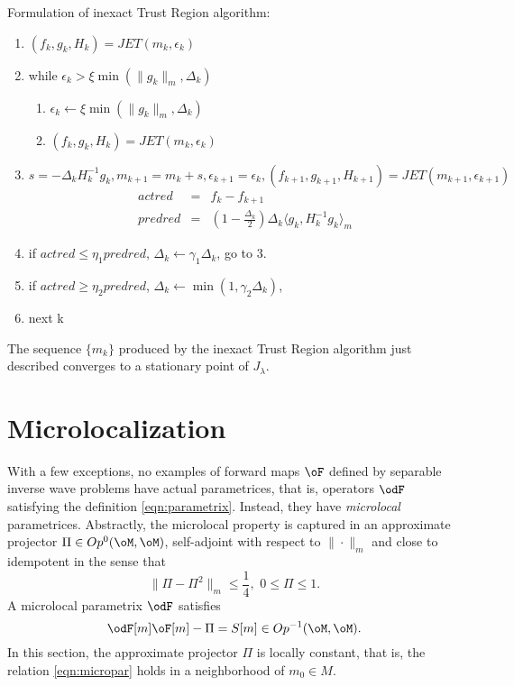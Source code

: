 Formulation of inexact Trust Region algorithm:

\begin{enumerate}
  \item $(f_k,g_k,H_k) =JET(m_k,\epsilon_k)$
  \item while $\epsilon_k > \xi \min(\|g_k\|_m,\Delta_k)$ 
  \begin{enumerate}
    \item $\epsilon_k \leftarrow \xi \min(\|g_k\|_m,\Delta_k)$
    \item $(f_k,g_k,H_k) =JET(m_k,\epsilon_k)$
  \end{enumerate}
  \item $s = -\Delta_k H_k^{-1}g_k, m_{k+1}=m_k+s, \epsilon_{k+1} = \epsilon_k,
    (f_{k+1},g_{k+1},H_{k+1}) = JET(m_{k+1},\epsilon_{k+1})$
    \begin{eqnarray}
    \label{eqn:actpred}
    actred &=&f_k-f_{k+1}\\
    predred &=& \left(1-\frac{\Delta_k}{2}\right)
                \Delta_k\langle g_k,H_k^{-1}g_k\rangle_m
    \end{eqnarray}
  \item if $actred \le \eta_1 predred$, $\Delta_k \leftarrow \gamma_1 
      \Delta_k$, go to 3.
  \item if $actred \ge \eta_2 predred$, $\Delta_k \leftarrow \min(1,\gamma_2 
      \Delta_k)$, 
  \item next k
\end{enumerate}

\begin{cor} The sequence $\{m_k\}$ produced by the
  inexact Trust Region algorithm just described converges to a
  stationary point of $J_{\lambda}$.
\end{cor}

\section{Microlocalization}

With a few exceptions, no examples of forward maps $\oF$ defined by
separable inverse wave problems have actual parametrices, that is,
operators $\odF$ satisfying the definition
\ref{eqn:parametrix}. Instead, they have {\em microlocal}
parametrices. Abstractly, the microlocal property is captured in an
approximate projector $\Pi \in Op^0(\oM,\oM)$, self-adjoint with
respect to $\|\cdot\|_m$ and close to idempotent in
the sense that 
\begin{equation}
\label{eqn:approxidem}
\|\Pi - \Pi^2\|_m \le \frac{1}{4},\,\,0 \le \Pi \le 1.
\end{equation}
A microlocal parametrix $\odF$ satisfies
\begin{equation}
\label{eqn:micropar}
\odF[m]\oF[m] - \Pi = S[m] \in Op^{-1}(\oM,\oM).
\end{equation}
In this section, the approximate projector $\Pi$ is locally constant,
that is, the relation \ref{eqn:micropar} holds in a neighborhood of
$m_0 \in M$.

